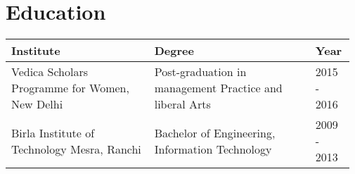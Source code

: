 \section{Education}
\raggedleft
\begin{tabularx}{.97\textwidth}{|>{\centering\arraybackslash}p{0.40\linewidth}|>{\centering\arraybackslash}p{0.45\linewidth}|>{\centering\arraybackslash}p{0.117\linewidth}|}
    \hline
    \rowcolor[gray]{0.9}
    \small Institute & \small Degree & \small Year \\
    \hline
    \small Vedica Scholars Programme for Women, New Delhi & \small Post-graduation in management Practice and liberal Arts & \small 2015 - 2016 \\
    \hline
    \small Birla Institute of Technology Mesra, Ranchi & \small Bachelor of Engineering, Information Technology & \small 2009 - 2013 \\
    \hline
\end{tabularx}


